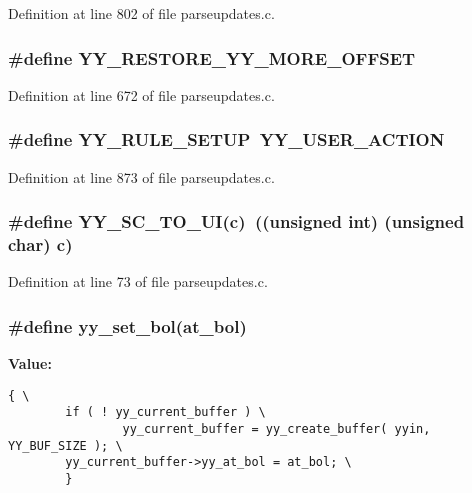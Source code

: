 Definition at line 802 of file parseupdates.c.
\subsubsection{\setlength{\rightskip}{0pt plus 5cm}\#define YY\_\-RESTORE\_\-YY\_\-MORE\_\-OFFSET}\label{parseupdates_8c_a38}




Definition at line 672 of file parseupdates.c.
\subsubsection{\setlength{\rightskip}{0pt plus 5cm}\#define YY\_\-RULE\_\-SETUP\ YY\_\-USER\_\-ACTION}\label{parseupdates_8c_a57}




Definition at line 873 of file parseupdates.c.
\subsubsection{\setlength{\rightskip}{0pt plus 5cm}\#define YY\_\-SC\_\-TO\_\-UI(c)\ ((unsigned int) (unsigned char) c)}\label{parseupdates_8c_a6}




Definition at line 73 of file parseupdates.c.
\subsubsection{\setlength{\rightskip}{0pt plus 5cm}\#define yy\_\-set\_\-bol(at\_\-bol)}\label{parseupdates_8c_a26}


{\bf Value:}

\footnotesize\begin{verbatim}{ \
        if ( ! yy_current_buffer ) \
                yy_current_buffer = yy_create_buffer( yyin, YY_BUF_SIZE ); \
        yy_current_buffer->yy_at_bol = at_bol; \
        }
\end{verbatim}\normalsize 


